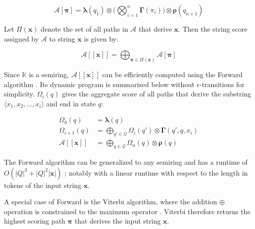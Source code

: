\begin{equation}
  \mathcal{A}[\bm{\pi}] = \bm{\lambda}(q_1) \otimes \Bigg( \bigotimes_{i=1}^n \bm{\Gamma}(\pi_i) \Bigg) \otimes \bm{\rho}(q_{n+1})
\end{equation}

\begin{definition}
  \label{def:string_score}
  Let $\Pi(\bm{x})$ denote the set of all paths in $\mathcal{A}$ that derive
  $\bm{x}$. Then the string score assigned by $\mathcal{A}$ to string $\bm{x}$
  is given by:
  
\end{definition}

\begin{equation}
  \mathcal{A}[\![\bm{x}]\!] = \bigoplus_{\bm{\pi} \in \Pi(\bm{x})} \mathcal{A}[\bm{\pi}]
\end{equation}

\begin{remark}
  Since $\mathbb{K}$ is a semiring, $\mathcal{A}[\![\bm{x}]\!]$ can be
  efficiently computed using the Forward algorithm \citep{baum1966statistical}.
  Its dynamic program is summarized below without $\epsilon$-transitions for
  simplicity. $\Omega_i(q)$ gives the aggregate score of all paths that derive
  the substring $\langle x_1, x_2, \dots, x_i \rangle$ and end in state $q$:
 
  \begin{subequations}
    \begin{align}
      \Omega_0(q) &= \bm{\lambda}(q) \\
      \Omega_{i+1}(q) &= \bigoplus_{q' \in \mathcal{Q}} \Omega_i(q') \otimes \bm{\Gamma}(q',q,x_i)  \\
      \mathcal{A}[\![\bm{x}]\!] &= \bigoplus_{q \in \mathcal{Q}} \Omega_n(q) \otimes \bm{\rho}(q)
    \end{align}
  \end{subequations}

\end{remark}

\begin{remark}
  \label{rmk:old_runtime}
  The Forward algorithm can be generalized to any semiring
  \citep{eisner2002parameter} and has a runtime of $O(|Q|^3 + |Q|^2|\bm{x}|)$
  \citep{schwartz2018sopa}; notably with a linear runtime with respect to the
  length in tokens of the input string $\bm{x}$.
\end{remark}

\begin{remark}
  A special case of Forward is the Viterbi algorithm, where the addition
  $\oplus$ operation is constrained to the maximum operator
  \citep{viterbi1967error}. Viterbi therefore returns the highest scoring path
  $\bm{\pi}$ that derives the input string $\bm{x}$.
\end{remark}

